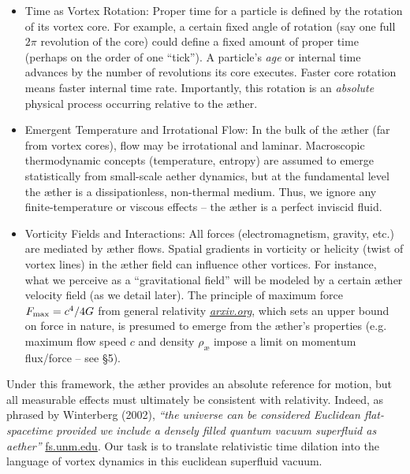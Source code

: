 \documentclass[aps,preprint,superscriptaddress]{revtex4}
\begin{document}
\begin{itemize}
        \item
        Time as Vortex Rotation: Proper time for a particle is defined by the rotation of its vortex core. For example, a certain fixed angle of rotation (say one full $2\pi$ revolution of the core) could define a fixed amount of proper time (perhaps on the order of one “tick”). A particle’s \textit{age} or internal time advances by the number of revolutions its core executes. Faster core rotation means faster internal time rate. Importantly, this rotation is an \textit{absolute} physical process occurring relative to the æther.

        \item
        Emergent Temperature and Irrotational Flow: In the bulk of the æther (far from vortex cores), flow may be irrotational and laminar. Macroscopic thermodynamic concepts (temperature, entropy) are assumed to emerge statistically from small-scale aether dynamics, but at the fundamental level the æther is a dissipationless, non-thermal medium. Thus, we ignore any finite-temperature or viscous effects – the æther is a perfect inviscid fluid.

        \item
        Vorticity Fields and Interactions: All forces (electromagnetism, gravity, etc.) are mediated by æther flows. Spatial gradients in vorticity or helicity (twist of vortex lines) in the æther field can influence other vortices. For instance, what we perceive as a “gravitational field” will be modeled by a certain æther velocity field (as we detail later). The principle of maximum force $F_{\rm max}=c^4/4G$ from general relativity
        \href{https://arxiv.org/abs/2205.06302#:~:text=the%20principle%20of%20maximum%20force,The%20limits%20illuminate}{\textit{arxiv.org}}, which sets an upper bound on force in nature, is presumed to emerge from the æther’s properties (e.g. maximum flow speed $c$ and density $\rho_{\text{\ae}}$ impose a limit on momentum flux/force – see §5).
    \end{itemize}

    Under this framework, the æther provides an absolute reference for motion, but all measurable effects must ultimately be consistent with relativity. Indeed, as phrased by Winterberg (2002), \textit{“the universe can be considered Euclidean flat-spacetime provided we include a densely filled quantum vacuum superfluid as aether”}
    \href{https://fs.unm.edu/QuantizationDiscretization.pdf#:~:text=Winterberg%20,an%20equal%20number%20of%20positive}{fs.unm.edu}. Our task is to translate relativistic time dilation into the language of vortex dynamics in this euclidean superfluid vacuum.
\end{document}
